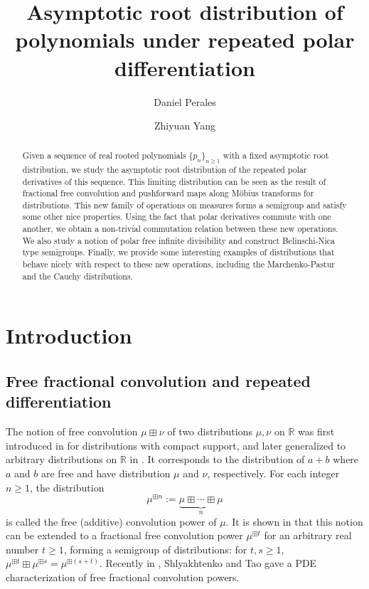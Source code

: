 \documentclass[reqno,11pt]{amsart}
\title[Root distribution under repeated polar differentiation]{Asymptotic root distribution of polynomials under repeated polar differentiation}
\author{Daniel Perales}
\author{Zhiyuan Yang}
\theoremstyle{remark}
\newcommand{\rr}{\mathbb{R}}
\begin{document}
\begin{abstract}
    Given a sequence of real rooted polynomials $\{p_n\}_{n\geq 1}$ with a fixed asymptotic root distribution, we study the asymptotic root distribution of the repeated polar derivatives of this sequence. This limiting distribution can be seen as the result of fractional free convolution and pushforward maps along Möbius transforms for distributions. This new family of operations on measures forms a semigroup and satisfy some other nice properties. Using the fact that polar derivatives commute with one another, we obtain a non-trivial commutation relation between these new operations. We also study a notion of polar free infinite divisibility and construct Belinschi-Nica type semigroups. Finally, we provide some interesting examples of distributions that behave nicely with respect to these new operations, including the Marchenko-Pastur and the Cauchy distributions.
\end{abstract}

\maketitle

\setcounter{tocdepth}{1}
\tableofcontents


\section{Introduction}

\subsection{Free fractional convolution and repeated differentiation}

The notion of free convolution $ \mu\boxplus \nu $ of two distributions $\mu,\nu$ on $\rr$ was first introduced in \cite{voiculescu1986addition} for distributions with compact support, and later generalized to arbitrary distributions on $\rr$ in \cite{bercovici1993free}. It corresponds to the distribution of $a+b$ where $a$ and $b$ are free and have distribution $\mu$ and $\nu$, respectively. For each integer $n\geq 1$,  the distribution 
$$ \mu^{\boxplus n}:= \underbrace{\mu\boxplus \cdots \boxplus \mu}_{n} $$ is called the free (additive) convolution power of $ \mu$. It is shown in \cite{bercovici1995superconvergence, nica1996multiplicative} that this notion can be extended to a fractional free convolution power $ \mu^{\boxplus t} $  for an arbitrary real number $ t\geq 1 $, forming a semigroup of distributions: for $t,s\geq 1$, $\mu^{\boxplus t}\boxplus \mu^{\boxplus s} = \mu^{\boxplus (s+t)}$.
Recently in \cite{shlyakhtenko2022fractional}, Shlyakhtenko and Tao gave a PDE characterization of free fractional convolution powers.
\end{document}

